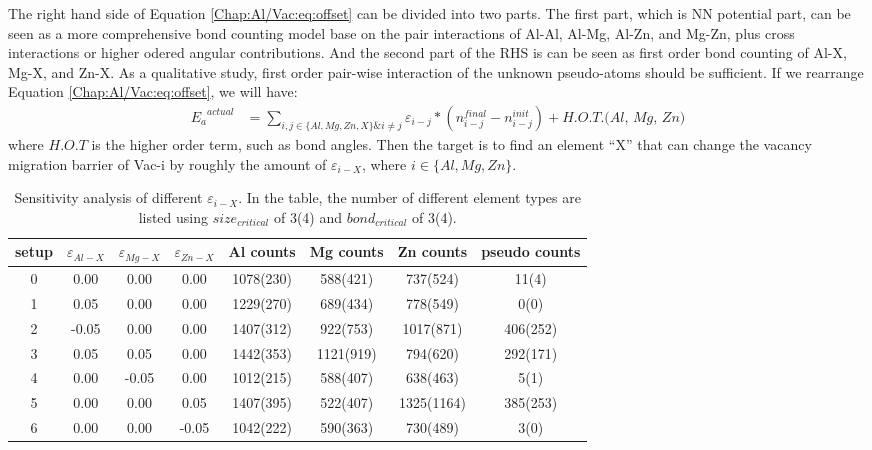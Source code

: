 The right hand side of Equation \ref{Chap:Al/Vac:eq:offset} can be divided into two parts. The first part, which is \ac{NN} potential part, can be seen as a more comprehensive bond counting model \cite{soisson1996monte} base on the pair interactions of Al-Al, Al-Mg, Al-Zn, and Mg-Zn, plus cross interactions or higher odered angular contributions. And the second part of the RHS is can be seen as first order bond counting of Al-X, Mg-X, and Zn-X. As a qualitative study, first order pair-wise interaction of the unknown pseudo-atoms should be sufficient. If we rearrange Equation \ref{Chap:Al/Vac:eq:offset}, we will have:
\begin{subequations}
\begin{align}
{E_a}^{actual} & = \sum_{i, j \in\{Al, Mg, Zn, X\} \& i \neq j} \varepsilon_{i-j} * ( n_{i-j}^{final} - n_{i-j}^{init}) + \textit{H.O.T.(Al, Mg, Zn)} \label{Chap:Al/Vac:eq:rearrange}
\end{align}
\end{subequations}
where $H.O.T$ is the higher order term, such as bond angles. Then the target is to find an element ``X'' that can change the vacancy migration barrier of Vac-i by roughly the amount of $\varepsilon_{i-X}$, where $i \in \{Al, Mg, Zn\}$.


\begin{table}[!htbp]
\centering
\caption[Sensitivity analysis of different $\varepsilon_{i-X}$.]{Sensitivity analysis of different $\varepsilon_{i-X}$. In the table, the number of different element types are listed using $size_{critical}$ of 3(4) and $bond_{critical}$ of 3(4).}
\label{Chap:Al/Vac:tab:pseudo1}
\begin{tabular}{cccccccc}
\\
\hline
\hline
setup & $\varepsilon_{Al-X}$  & $\varepsilon_{Mg-X}$  & $\varepsilon_{Zn-X}$ & Al counts & Mg counts & Zn counts & pseudo counts\\
\hline
0 &  0.00    &  0.00       &  0.00 & 1078(230) & 588(421)  &  737(524)  & 11(4)                \\
1 &  0.05    &  0.00       &  0.00 & 1229(270) &  689(434) &   778(549) & 0(0)                \\
2 & -0.05    &  0.00       &  0.00 & 1407(312) & 922(753)  & 1017(871)  & 406(252)                \\
3 &  0.05    &  0.05       &  0.00 & 1442(353) & 1121(919) & 794(620)   & 292(171)                \\
4 &  0.00    & -0.05       &  0.00 & 1012(215) &  588(407) &  638(463)  & 5(1)                \\
5 &  0.00    &  0.00       &  0.05 & 1407(395) & 522(407)  & 1325(1164) & 385(253)                \\
6 &  0.00    &  0.00       & -0.05 & 1042(222) &  590(363) &  730(489)  & 3(0)                \\

\hline
\hline
\end{tabular}
\end{table}


